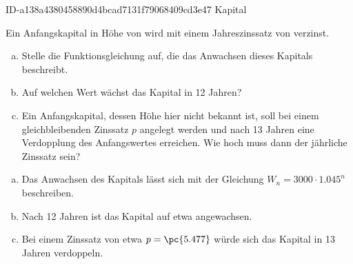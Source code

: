 \begin{exercise}
      {ID-a138a4380458890d4bcad7131f79068409cd3e47}
      {Kapital}
  \ifproblem\problem\par
    Ein Anfangskapital in Höhe von  wird mit einem Jahreszinssatz
    von  verzinst.
    \begin{enumerate}[a)]
      \item Stelle die Funktionsgleichung auf, die das Anwachsen dieses
            Kapitals beschreibt.
      \item Auf welchen Wert wächst das Kapital in 12 Jahren?
      \item Ein Anfangskapital, dessen Höhe hier nicht bekannt ist, soll
            bei einem gleichbleibenden Zinssatz $p$ angelegt werden und nach
            13 Jahren eine Verdopplung des Anfangswertes erreichen.
            Wie hoch muss dann der jährliche Zinssatz sein?
    \end{enumerate}
  \fi
  \ifoutcome\outcome\par
    \begin{enumerate}[a)]
      \item Das Anwachsen des Kapitals lässt sich mit der Gleichung
            $W_{n}=\num{3000}\cdot\num{1.045}^{n}$ beschreiben.
      \item Nach 12 Jahren ist das Kapital auf etwa 
            angewachsen.
      \item Bei einem Zinssatz von etwa $p=\pc{5.477}$ würde sich das
            Kapital in 13 Jahren verdoppeln.
    \end{enumerate}
  \fi
\end{exercise}
